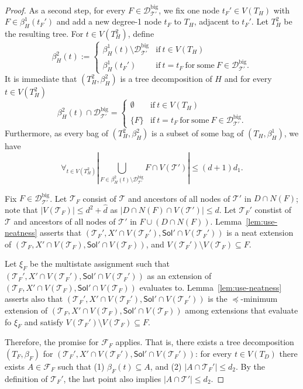 \documentclass[10pt,a4paper]{amsart}
\def\Sol{\mathsf{Sol}}
\def\T{\mathcal{T}}
\begin{document}
\begin{proof}
As a second step, for every $F \in \mathcal{D}^\mathrm{big}_{\T'}$, we fix one node $t_F' \in V(T_H)$ with $F \in \beta_H^1(t_F')$ and add a new degree-1 node $t_F$ to $T_H$, adjacent to $t_F'$. 
Let $T_H^2$ be the resulting tree. For $t \in V(T_H^2)$, define
\[ \beta_H^2(t) := \begin{cases} \beta_H^1(t) \setminus \mathcal{D}^\mathrm{big}_{\T'} & \mathrm{if}\ t \in V(T_H)\\ \beta_H^1(t_F') &\mathrm{if}\ t=t_F\ \mathrm{for\ some\ }F \in \mathcal{D}^\mathrm{big}_{\T'}. \end{cases} \]
It is immediate that $(T_H^2,\beta_H^2)$ is a tree decomposition of $H$ and for every $t \in V(T_H^2)$
\[ \beta_H^2(t) \cap \mathcal{D}^\mathrm{big}_{\T'} = \begin{cases} \emptyset & \mathrm{if}\ t \in V(T_H) \\
    \{F\} & \mathrm{if}\ t=t_F\ \mathrm{for\ some\ }F \in \mathcal{D}^\mathrm{big}_{\T'}. \end{cases} \]
 Furthermore, as every bag of $(T_H^2,\beta_H^2)$ is a subset of some bag of $(T_H,\beta_H^1)$, we have
 \begin{equation}\label{eq:handle-bip:2bound}
   \forall_{t \in V(T_H^2)} \left|\bigcup_{F \in \beta_H^2(t) \setminus \mathcal{D}^\mathrm{big}_{\T'}} F \cap V(\T')\right| \leq  (d+1)d_1. 
 \end{equation}

 Fix $F \in \mathcal{D}^\mathrm{big}_{\T'}$.
 Let $\T_F$ consist of $\T$ and ancestors
 of all nodes of $\T'$ in $D \cap N(F)$; note that $|V(\T_F)| \leq d^2 + \widehat{d}$
 as $|D \cap N(F) \cap V(\T')| \leq d$.
 Let $\T_F'$ constist of $\T$ and ancestors
 of all nodes of $\T'$ in $F \cup (D \cap N(F))$. 
 Lemma~\ref{lem:use-neatness} asserts that 
 $(\T_F', X' \cap V(\T_F'), \Sol' \cap V(\T_F'))$ is a neat extension
 of $(\T_F, X' \cap V(\T_F), \Sol' \cap V(\T_F))$, 
 and $V(\T_F') \setminus V(\T_F) \subseteq F$.
 
 Let $\xi_F$ be the multistate assignment such that
 $(\T_F', X' \cap V(\T_F'), \Sol' \cap V(\T_F'))$ as an extension of
 $(\T_F, X' \cap V(\T_F), \Sol' \cap V(\T_F))$ evaluates to. 
 Lemma~\ref{lem:use-neatness} asserts also 
 that $(\T_F', X' \cap V(\T_F'), \Sol' \cap V(\T_F'))$ is the $\preceq$-minimum
 extension of $(\T_F, X' \cap V(\T_F), \Sol' \cap V(\T_F))$
 among extensions that evaluate fo $\xi_F$ and 
 satisfy $V(\T_F') \setminus V(\T_F) \subseteq F$.

Therefore, the promise for $\mathcal{F}_F$ applies.
That is, there exists a tree decomposition $(T_F,\beta_F)$ for $(\T_F',X' \cap V(\T_F'), \Sol' \cap V(\T_F'))$:
 for every $t \in V(T_D)$ there exists $A \in \mathcal{F}_F$ such that
  (1) $\beta_F(t) \subseteq A$, and (2) $|A \cap \T_F'| \leq d_2$. 
  By the definition of $\T_F'$, the last point also implies
  $|A \cap \T'| \leq d_2$.


\end{proof}
\end{document}
